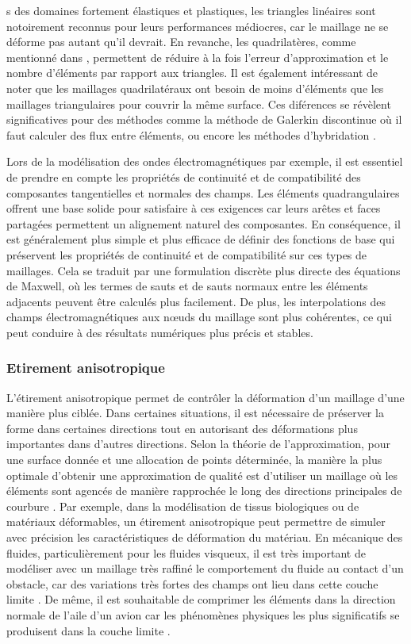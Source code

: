 s des domaines fortement élastiques et plastiques, les triangles linéaires sont notoirement reconnus pour leurs performances médiocres, car le maillage ne se déforme pas autant qu'il devrait. En revanche, les quadrilatères, comme mentionné dans \cite{shepherd2008hexahedral}, permettent de réduire à la fois l'erreur d'approximation et le nombre d'éléments par rapport aux triangles. Il est également intéressant de noter que les maillages quadrilatéraux ont besoin de moins d’éléments que les maillages triangulaires pour couvrir la même surface. Ces diférences se révèlent significatives pour des méthodes comme la méthode de Galerkin discontinue où il faut calculer des flux entre éléments, ou encore les méthodes d’hybridation \cite{reberol2018maillages}.

 Lors de la modélisation des ondes électromagnétiques par exemple, il est essentiel de prendre en compte les propriétés de continuité et de compatibilité des composantes tangentielles et normales des champs. Les éléments quadrangulaires offrent une base solide pour satisfaire à ces exigences car leurs arêtes et faces partagées permettent un alignement naturel des composantes. En conséquence, il est généralement plus simple et plus efficace de définir des fonctions de base qui préservent les propriétés de continuité et de compatibilité sur ces types de maillages. Cela se traduit par une formulation discrète plus directe des équations de Maxwell, où les termes de sauts et de sauts normaux entre les éléments adjacents peuvent être calculés plus facilement. De plus, les interpolations des champs électromagnétiques aux nœuds du maillage sont plus cohérentes, ce qui peut conduire à des résultats numériques plus précis et stables.

\subsubsection{Etirement anisotropique}

L'étirement anisotropique permet de contrôler la déformation d'un maillage d'une manière plus ciblée. Dans certaines situations, il est nécessaire de préserver la forme dans certaines directions tout en autorisant des déformations plus importantes dans d'autres directions. Selon la théorie de l'approximation, pour une surface donnée et une allocation de points déterminée, la manière la plus optimale d'obtenir une approximation de qualité est d'utiliser un maillage où les éléments sont agencés de manière rapprochée le long des directions principales de courbure \cite{d2000bilinear}. Par exemple, dans la modélisation de tissus biologiques ou de matériaux déformables, un étirement anisotropique peut permettre de simuler avec précision les caractéristiques de déformation du matériau. En mécanique des fluides, particulièrement pour les fluides visqueux, il est très important de modéliser avec un maillage très raffiné le comportement du fluide au contact d’un obstacle, car des variations très fortes des champs ont lieu dans cette couche limite \cite{reberol2018maillages}. De même, il est souhaitable de comprimer les éléments dans la direction normale de l'aile d'un avion car les phénomènes physiques les plus significatifs se produisent dans la couche limite \cite{bommes2013quad}.

